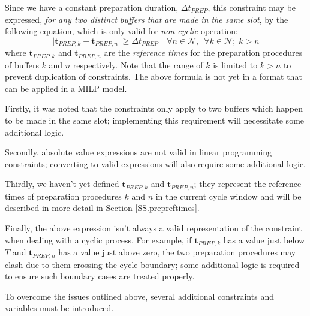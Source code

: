 Since we have a constant preparation duration, 
$\Delta t_{\mathit{PREP}}$, this constraint may be expressed, 
\emph{for any two distinct buffers that are made in the same slot}, by the
following equation, which is only valid for \emph{non-cyclic} operation:
\begin{equation}
    \lvert \boldsymbol{t}_{\mathit{PREP},k} - \boldsymbol{t}_{\mathit{PREP},n}
    \rvert \ge \Delta t_{\mathit{PREP}} \quad \forall n \in \mathcal{N},
    \enspace \forall k \in \mathcal{N}; \; k > n
    \label{eq.mod}
\end{equation}
\noindent where $\boldsymbol{t}_{\mathit{PREP},k}$ and
$\boldsymbol{t}_{\mathit{PREP},n}$ are the \emph{reference times}
for the preparation procedures of buffers $k$ and $n$ respectively.
Note that the range of $ k $ is limited to $ k > n $ to prevent duplication
of constraints.
The above formula is not yet in a format that can be applied in a MILP model.

Firstly, it was noted that the constraints only apply to two buffers which
happen to be made in the same slot; implementing this requirement will
necessitate some additional logic.

Secondly, absolute value expressions are not valid in linear programming
constraints; converting to valid expressions will also require some additional
logic.

Thirdly, we haven't yet defined $\boldsymbol{t}_{\mathit{PREP},k}$ and 
$\boldsymbol{t}_{\mathit{PREP},n}$; they represent the reference times of
preparation procedures $k$ and $n$ in the current cycle window and will be
described in more detail in 
\hyperref[SS.prepreftimes]{Section \ref*{SS.prepreftimes}}.

Finally, the above expression isn't always a valid representation of the
constraint when dealing with a cyclic process.
For example, if $\boldsymbol{t}_{\mathit{PREP},k}$ has a value just below $T$
and $\boldsymbol{t}_{\mathit{PREP},n}$ has a value just above zero, the two
preparation procedures may clash due to them crossing the cycle boundary; some
additional logic is required to ensure such boundary cases are treated
properly.

To overcome the issues outlined above, several additional constraints and
variables must be introduced.

